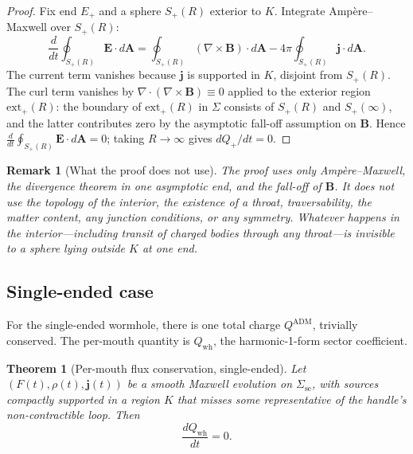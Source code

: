 \documentclass[aps,prd,onecolumn,nofootinbib,superscriptaddress]{revtex4-2}
\newtheorem{theorem}{Theorem}
\newtheorem{remark}{Remark}
\begin{document}
\begin{proof}
Fix end $E_+$ and a sphere $S_+(R)$ exterior to $K$.  Integrate
Amp\`ere--Maxwell over $S_+(R)$:
\begin{equation}
  \frac{d}{dt}\oint_{S_+(R)}\bm{E}\cdot d\bm{A}
  = \oint_{S_+(R)}(\nabla\times\bm{B})\cdot d\bm{A}
  - 4\pi\oint_{S_+(R)}\bm{j}\cdot d\bm{A}.
\end{equation}
The current term vanishes because $\bm{j}$ is supported in $K$, disjoint from
$S_+(R)$.  The curl term vanishes by $\nabla\cdot(\nabla\times\bm{B})\equiv 0$
applied to the exterior region $\mathrm{ext}_+(R)$: the boundary of
$\mathrm{ext}_+(R)$ in $\Sigma$ consists of $S_+(R)$ and $S_+(\infty)$, and
the latter contributes zero by the asymptotic fall-off assumption on $\bm{B}$.
Hence $\frac{d}{dt}\oint_{S_+(R)}\bm{E}\cdot d\bm{A}=0$; taking $R\to\infty$
gives $dQ_+/dt=0$.
\end{proof}

\begin{remark}[What the proof does not use]
The proof uses only Amp\`ere--Maxwell, the divergence theorem in one
asymptotic end, and the fall-off of $\bm{B}$.  It does \emph{not} use the
topology of the interior, the existence of a throat, traversability, the
matter content, any junction conditions, or any symmetry.  Whatever happens in
the interior---including transit of charged bodies through any throat---is
invisible to a sphere lying outside $K$ at one end.
\end{remark}

\subsection{Single-ended case}

For the single-ended wormhole, there is one total charge $Q^{\mathrm{ADM}}$,
trivially conserved.  The per-mouth quantity is $Q_{\mathrm{wh}}$, the
harmonic-1-form sector coefficient.

\begin{theorem}[Per-mouth flux conservation, single-ended]
\label{thm:Q-conservation-1e}
Let $(F(t),\rho(t),\bm{j}(t))$ be a smooth Maxwell evolution on
$\Sigma_{\mathrm{se}}$, with sources compactly supported in a region $K$ that
misses some representative of the handle's non-contractible loop.  Then
\begin{equation}
  \frac{dQ_{\mathrm{wh}}}{dt} = 0.
\end{equation}
\end{theorem}
\end{document}
